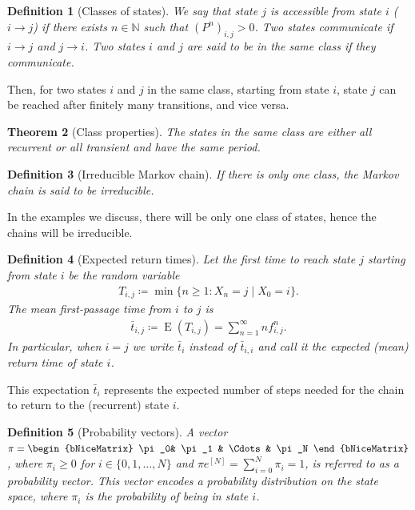 \documentclass[11pt]{amsart}
\theoremstyle{plain}
\newtheorem{teo}{Theorem}[section]
\newtheorem{defi}[teo]{Definition}
\newcommand{\N}{\mathbb{N}}
\newcommand{\1}{\text{\fontseries{bx}\selectfont \textup 1}}
\begin{document}
\begin{defi}[Classes of states]
	We say that state $j$ is {\emph{accessible}} from state $i$ ($i\to j$) if there exists $n\in\N$ such that $(P^n)_{i,j}>0$. Two states {\emph{communicate}} if $i\to j$ and $j\to i$.
	Two states $i$ and $j$ are said to be in the same {class} if they communicate.
\end{defi}

Then, for two states $i$ and $j$ in the same class, starting from state $i$, state $j$ can be reached after finitely many transitions, and vice versa.

\begin{teo}[Class properties]
	The {states in the same class are either all recurrent or all transient and have the same period}.
\end{teo}

\begin{defi}[Irreducible Markov chain]
	{If there is only one class, the Markov chain is said to be irreducible}.
\end{defi}

In the examples we discuss, there will be only one class of states, hence the chains will be irreducible.

\begin{defi}[Expected return times]
	Let the first time to reach state $j$ starting from state $i$ be the random variable
	\begin{align*}
		T_{i,j}\coloneq \min\{n\geq 1:X_{n}=j\mid X_{0}=i\}.
	\end{align*}
	The mean first-passage time from $i$ to $j$ is
	\begin{align*}
		\bar t _{i,j}\coloneq \operatorname {E}(T_{i,j})=\sum_{n=1}^{\infty }n f^n_{i,j}.
	\end{align*}
	In particular, when $i=j$ we write $\bar t_i$ instead of $\bar t_{i,i}$ and call it the expected (mean) return time of state $i$.
\end{defi}

This expectation $\bar t_i$ represents the expected number of steps needed for the chain to return to the (recurrent) state $i$.

\begin{defi}[Probability vectors]
	A vector $\pi = \begin{bNiceMatrix}
		\pi_0&	\pi_1 & \Cdots & \pi_N
	\end{bNiceMatrix}$, where $\pi_i \geq 0$ for $i \in \{0,1,\dots,N\}$ and $\pi e^{[N]} = \sum_{i=0}^N \pi_i = 1$, is referred to as a probability vector. This vector encodes a probability distribution on the state space, where $\pi_i$ is the probability of being in state $i$.
\end{defi}
\end{document}
